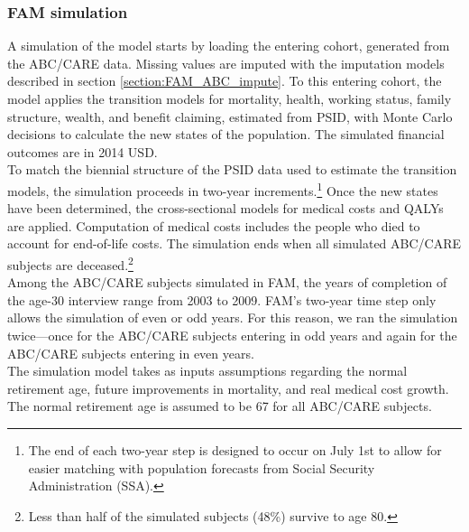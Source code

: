 


\subsubsection{FAM simulation}

\noindent A simulation of the model starts by loading the entering cohort, generated from the ABC/CARE data. Missing values are imputed with the imputation models described in section \ref{section:FAM_ABC_impute}. To this entering cohort, the model applies the transition models for mortality, health, working status, family structure, wealth, and benefit claiming, estimated from PSID, with Monte Carlo decisions to calculate the new states of the population.
The simulated financial outcomes are in 2014 USD. \\


\noindent To match the biennial structure of the PSID data used to estimate the transition models, the simulation proceeds in two-year increments.\footnote{The end of each two-year step is designed to occur on July 1st to allow for easier matching with population forecasts from Social Security Administration (SSA).}
Once the new states have been determined, the cross-sectional models for medical costs and QALYs are applied.
Computation of medical costs includes the people who died to account for end-of-life costs.
The simulation ends when all simulated ABC/CARE subjects are deceased.\footnote{Less than half of the simulated subjects (48\%) survive to age 80.}\\

\noindent Among the ABC/CARE subjects simulated in FAM, the years of completion of the age-30 interview range from 2003 to 2009.
FAM's two-year time step only allows the simulation of even or odd years.
For this reason, we ran the simulation twice---once for the ABC/CARE subjects entering in odd years and again for the ABC/CARE subjects entering in even years. \\

\noindent The simulation model takes as inputs assumptions regarding the normal retirement age, future improvements in mortality, and real medical cost growth.
The normal retirement age is assumed to be 67 for all ABC/CARE subjects. \\

